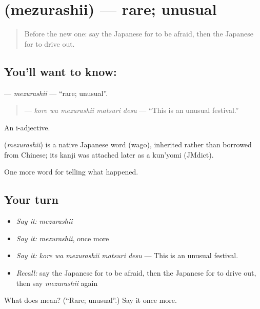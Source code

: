 \section[\texorpdfstring{\ja{めずらしい} (mezurashii)}{めずらしい (mezurashii)}]{ (mezurashii) — rare; unusual}

\label{lesson:JA-C297-mezurashii}



\begin{quote}
Before the new one: say the Japanese for to be afraid, then the Japanese for to drive out.
\end{quote}

\subsection*{You'll want to know: }
\textbf{} — \emph{mezurashii} — \textquotedblleft{}rare; unusual\textquotedblright{}.

\begin{quote}
\textbf{  } — \emph{kore wa mezurashii matsuri desu} — \textquotedblleft{}This is an unusual festival.\textquotedblright{}
\end{quote}

An i-adjective.

\begin{cousinweb}
\textbf{} (\emph{mezurashii}) is a native Japanese word (wago), inherited rather than borrowed from Chinese; its kanji was attached later as a kun'yomi (JMdict).
\end{cousinweb}

\begin{grammarlens}[title={What you've built}]
One more word for telling what happened.
\end{grammarlens}

\subsection*{Your turn}
\begin{itemize}
\raggedright
  \item \emph{Say it:} \emph{mezurashii}
  \item \emph{Say it:} \emph{mezurashii}, once more
  \item \emph{Say it:} \emph{kore wa mezurashii matsuri desu} — This is an unusual festival.
  \item \emph{Recall:} say the Japanese for to be afraid, then the Japanese for to drive out, then say \emph{mezurashii} again
\end{itemize}

\begin{tcolorbox}[breakable,colback=teal!4,colframe=teal!35!black,title={Before you move on}]
What does  mean? (\textquotedblleft{}Rare; unusual\textquotedblright{}.) Say it once more.
\end{tcolorbox}
